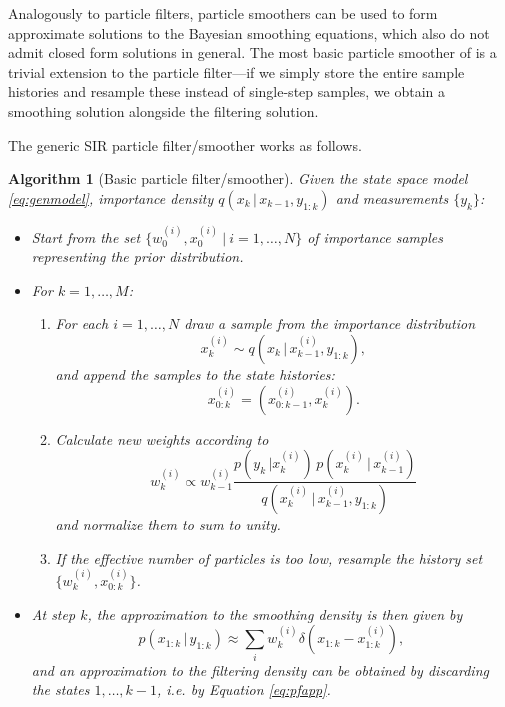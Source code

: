 \documentclass[twocolumn]{autart}    %
\newtheorem{algo}{Algorithm}[section]
\begin{document}
Analogously to particle filters, particle smoothers can be used to form approximate solutions to the Bayesian smoothing equations, which also do not admit closed form solutions in general. The most basic particle smoother of \cite{Kitagawa:1996} is a trivial extension to the particle filter---if we simply store the entire sample histories and resample these instead of single-step samples, we obtain a smoothing solution alongside the filtering solution.

The generic SIR particle filter/smoother \cite{Kitagawa:1996} works as follows.
%
\begin{algo}[Basic particle filter/smoother]
  Given the state space model \eqref{eq:genmodel}, importance
  density $q(x_{k} \, | \, x_{k-1},y_{1:k})$ and measurements $\{ y_k
  \}$:
\begin{itemize}
\item Start from the set $\{ w^{(i)}_0,x_0^{(i)} ~|~
  i=1,\ldots,N \}$ of importance samples representing the
  prior distribution.
\item For $k = 1,\ldots,M$:
\begin{enumerate}
\item For each $i=1,\ldots,N$ draw a sample from the importance
  distribution
  \begin{equation}
     x_k^{(i)} \sim q(x_{k} \, | \, x_{k-1}^{(i)},y_{1:k}),
  \end{equation}
%
  and append the samples to the state histories:
%
  \begin{equation}
     x_{0:k}^{(i)} = (x_{0:k-1}^{(i)},x_k^{(i)}).
  \end{equation}
%
\item Calculate new weights according to
  \begin{equation}
    w_k^{(i)} \propto
    w_{k-1}^{(i)} \frac{p(y_k \, | x_k^{(i)}) \, p(x_k^{(i)}\,|\,x_{k-1}^{(i)})}
                       {q(x_{k}^{(i)} \, | \, x_{k-1}^{(i)},y_{1:k})}
  \end{equation}
%
  and normalize them to sum to unity.

\item If the effective number of particles is too low, resample the
  history set $\{ w_k^{(i)}, x_{0:k}^{(i)} \}$.
\end{enumerate}

\item At step $k$, the approximation to the smoothing density is
  then given by
  \begin{equation}
     p(x_{1:k}\,|\,y_{1:k})
     \approx \sum_i w_k^{(i)} \delta(x_{1:k} - x_{1:k}^{(i)}),
  \end{equation}
  and an approximation to the filtering density can be obtained by
  discarding the states $1,\ldots,k-1$, i.e. by Equation \eqref{eq:pfapp}.
\end{itemize}
\end{algo}
\end{document}
